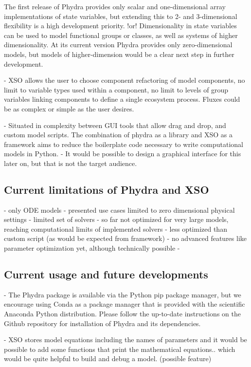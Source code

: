 \documentclass[journal abbreviation, manuscript]{copernicus}
\begin{document}
The first release of Phydra provides only scalar and one-dimensional array implementations of state variables, but extending this to 2- and 3-dimensional flexibility is a high development priority. 
!or!
Dimensionality in state variables can be used to model functional groups or classes, as well as systems of higher dimensionality. At its current version Phydra provides only zero-dimensional models, but models of higher-dimension would be a clear next step in further development.

- XSO allows the user to choose component refactoring of model components, no limit to variable types used within a component, no limit to levels of group variables linking components to define a single ecosystem process. Fluxes could be as complex or simple as the user desires.

- Situated in complexity between GUI tools that allow drag and drop, and custom model scripts. The combination of phydra as a library and XSO as a framework aims to reduce the boilerplate code necessary to write computational models in Python.
- It would be possible to design a graphical interface for this later on, but that is not the target audience.

\subsection{Current limitations of Phydra and XSO}
- only ODE models
- presented use cases limited to zero dimensional physical settings
- limited set of solvers
- so far not optimized for very large models, reaching computational limits of implemented solvers
- less optimized than custom script (as would be expected from framework)
- no advanced features like parameter optimization yet, although technically possible
- 

\subsection{Current usage and future developments}
- The Phydra package is available via the Python pip package manager, but we encourage using Conda as a package manager that is provided with the scientific Anaconda Python distribution.
Please follow the up-to-date instructions on the Github repository for installation of Phydra and its dependencies.

- XSO stores model equations including the names of parameters and it would be possible to add some functions that print the mathematical equations.. which would be quite helpful to build and debug a model. (possible feature)
\end{document}
